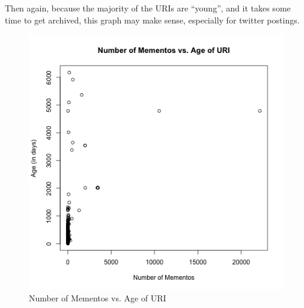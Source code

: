 \documentclass[letterpaper,11pt]{article}
\begin{document}
Then again, because the majority of the URIs are ``young'', and it takes some time to get archived, this graph may make sense, especially for twitter postings.

\begin{figure}
\includegraphics[scale=0.7]{work/q3/q3-scatterplot.png}
\caption{Number of Mementos vs. Age of URI}
\label{fig:q3scatter}
\end{figure}

\newpage

\end{document}
